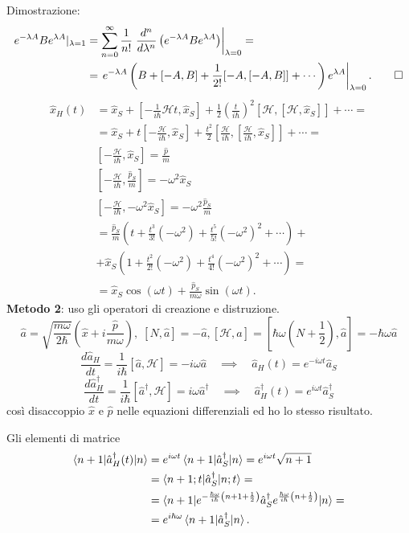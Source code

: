 \bigskip
\noindent
Dimostrazione:
\begin{align*}
e^{-\lambda A} B e^{\lambda A} |_{\lambda = 1} &= \sum_{n = 0}^\infty \frac{1}{n!} \left. \frac{d^n}{d\lambda^n} \left( e^{-\lambda A} B e^{\lambda A} \right) \right|_{\lambda = 0} = \\
&= \left. e^{-\lambda A} \left( B + [-A, B]  + \frac{1}{2!} [-A, [-A, B]] + \cdots \right) e^{\lambda A} \right|_{\lambda = 0}. \qed
\end{align*}
\begin{align*}
\hat{x}_H(t) &= \hat{x}_S + \left[ -\frac{1}{i\hbar} \mathcal{H} t, \hat{x}_S \right] + \frac{1}{2} \left(\frac{t}{i\hbar}\right)^2 \left[ \mathcal{H}, \left[ \mathcal{H}, \hat{x}_S \right] \right] + \cdots = \\
&= \hat{x}_S + t \left[ -\frac{\mathcal{H}}{i\hbar}, \hat{x}_S \right] + \frac{t^2}{2} \left[ \frac{\mathcal{H}}{i\hbar}, \left[ \frac{\mathcal{H}}{i\hbar}, \hat{x}_S \right] \right] + \cdots = \\
& \left[ -\frac{\mathcal{H}}{i\hbar}, \hat{x}_S \right] = \frac{\hat{p}}{m} \\
& \left[ -\frac{\mathcal{H}}{i\hbar}, \frac{\hat{p}_S}{m} \right] = -\omega^2\hat{x}_S \\
& \left[ -\frac{\mathcal{H}}{i\hbar}, -\omega^2\hat{x}_S \right] = -\omega^2 \frac{\hat{p}_S}{m} \\
&= \frac{\hat{p}_S}{m} \left( t + \frac{t^3}{3!} (-\omega^2) + \frac{t^5}{5!} (-\omega^2)^2 + \cdots \right) + \\
&+\hat{x}_S \left( 1 + \frac{t^2}{2!} (-\omega^2) + \frac{t^4}{4!} (-\omega^2)^2 + \cdots \right) = \\
&=\hat{x}_S \cos (\omega t) + \frac{\hat{p}_S}{m\omega} \sin(\omega t).
\end{align*}
\textbf{Metodo 2}: uso gli operatori di creazione e distruzione.
\[
\hat{a} = \sqrt{\frac{m\omega}{2\hbar}} \left( \hat{x} + i \frac{\hat{p}}{m\omega} \right), \; [N, \hat{a}] = -\hat{a}, [\mathcal{H}, \hat{a}] = \left[ \hbar \omega \left( N + \frac{1}{2} \right), \hat{a} \right] = -\hbar \omega \hat{a}
\]
\[
\frac{d \hat{a}_H}{dt} = \frac{1}{i\hbar} [\hat{a}, \mathcal{H}] = -i\omega \hat{a} \quad \implies \quad \hat{a}_H(t) = e^{-i\omega t} \hat{a}_S
\]
\[
\frac{d \hat{a}_H^\dag}{dt} = \frac{1}{i\hbar} [\hat{a}^\dag, \mathcal{H}] = i\omega \hat{a}^\dag \quad \implies \quad \hat{a}_H^\dag(t) = e^{i\omega t} \hat{a}_S^\dag
\]
così disaccoppio \( \hat{x} \) e \( \hat{p} \) nelle equazioni differenziali ed ho lo stesso risultato.

\bigskip
\noindent
Gli elementi di matrice
\begin{align*}
\braket{n + 1|\hat{a}_H^\dag(t)|n} &= e^{i\omega t} \braket{n + 1|\hat{a}_S^\dag|n} = e^{i\omega t} \sqrt{n + 1} \\
&= \braket{n + 1; t|\hat{a}_S^\dag|n; t} = \\
&= \braket{n + 1|e^{-\frac{\hbar\omega}{i\hbar}\left( n + 1 + \frac{1}{2} \right)} \hat{a}_S^\dag e^{\frac{\hbar\omega}{i\hbar} \left( n + \frac{1}{2} \right)}|n} = \\
&= e^{i\hbar\omega}\braket{n + 1|\hat{a}_S^\dag|n}.
\end{align*}